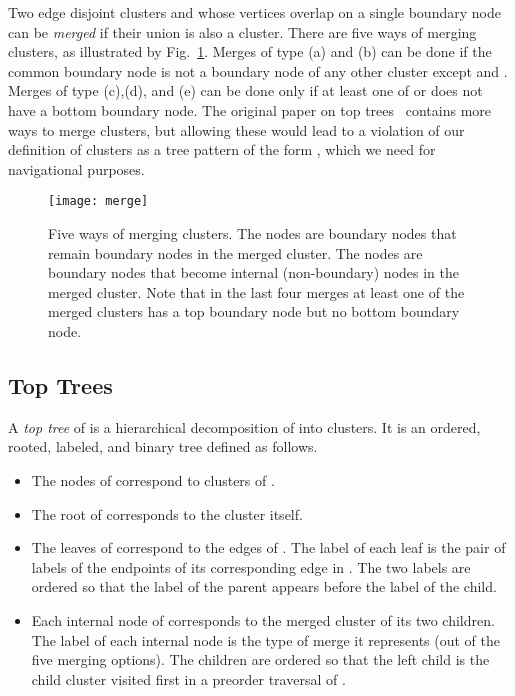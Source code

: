 \documentclass [11pt]{article}
\begin{document}
Two edge disjoint clusters  and  whose vertices overlap on a single boundary node can be \emph{merged} if their union  is also a cluster. There are five ways of merging clusters, as illustrated by Fig.~\ref{fig:merge}. Merges of type (a) and (b) can be done if the common boundary node is not a boundary node of any other cluster except  and . Merges of type (c),(d), and (e) can be done only if at least one of  or  does not have a bottom boundary node.
The original paper on top trees~\cite{AHLT1997,AHT2000,TopTrees} contains more ways to merge clusters, but allowing these would lead to a violation of our definition of clusters as a tree pattern of the form , which we need for navigational purposes.
\begin{figure}[tb]
   \centering
   \texttt{[image: merge]}
   \caption{Five ways of merging clusters. The  nodes are boundary nodes that remain  boundary nodes in the merged cluster. The  nodes are  boundary nodes that become internal (non-boundary) nodes in the merged cluster. Note that in the last four merges at least one of the  merged clusters has a top boundary node but no bottom boundary node.}
   \label{fig:merge}
\end{figure}

\subsection{Top Trees}
A \emph{top tree}  of  is a hierarchical decomposition of  into  clusters. It is 
an ordered, rooted, labeled, and binary tree defined as follows.
\begin{itemize}
\item[] The nodes of  correspond to clusters of .
\item[] The root of  corresponds to the cluster  itself.
\item[] The leaves of  correspond to the edges of . The label of each leaf is the pair of labels of the endpoints of its corresponding edge  in . The two labels are ordered so that the label of the parent  appears before the label of the child. 
\item[] Each internal node of  corresponds to the merged cluster of its two children. 
The label of each internal node is the type of merge it represents (out of the five merging options).  The children are ordered so  that the left child is the child cluster visited first in a preorder traversal of . 
\end{itemize}
\end{document}
